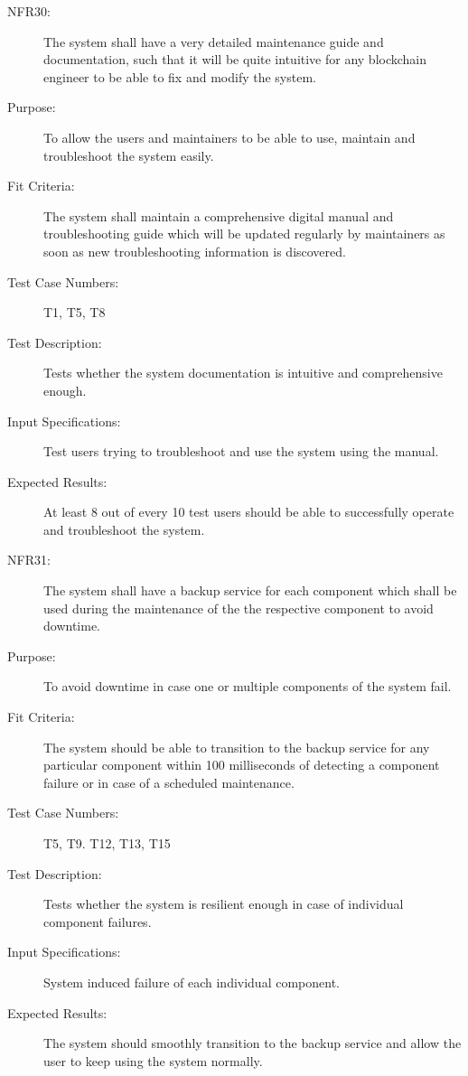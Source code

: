 \documentclass[a4paper,twoside,phd]{BYUPhys}
\begin{document}
\begin{description}
\item[NFR30:] The system shall have a very detailed maintenance guide and documentation, such that it will be quite intuitive for any blockchain engineer to be able to fix and modify the system.
\item[Purpose:] To allow the users and maintainers to be able to use, maintain and troubleshoot the system easily.
\item[Fit Criteria:] The system shall maintain a comprehensive digital manual and troubleshooting guide which will be updated regularly by maintainers as soon as new troubleshooting information is discovered.
\item[Test Case Numbers:] T1, T5, T8
\item[Test Description:] Tests whether the system documentation is intuitive and comprehensive enough.
\item[Input Specifications:] Test users trying to troubleshoot and use the system using the manual.
\item[Expected Results:] At least 8 out of every 10 test users should be able to successfully operate and troubleshoot the system.

\item[NFR31:] The system shall have a backup service for each component which shall be used during the maintenance of the the respective component to avoid downtime.
\item[Purpose:] To avoid downtime in case one or multiple components of the system fail.
\item[Fit Criteria:] The system should be able to transition to the backup service for any particular component within 100 milliseconds of detecting a component failure or in case of a scheduled maintenance.
\item[Test Case Numbers:] T5, T9. T12, T13, T15
\item[Test Description:] Tests whether the system is resilient enough in case of individual component failures.
\item[Input Specifications:] System induced failure of each individual component.
\item[Expected Results:] The system should smoothly transition to the backup service and allow the user to keep using the system normally.
\end{description}
\end{document}
